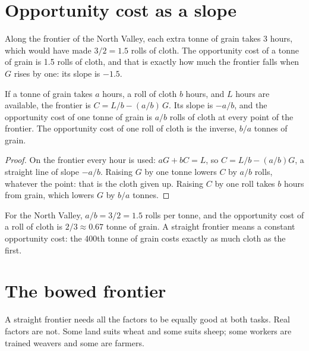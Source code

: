 \section{Opportunity cost as a slope}\label{sec:g10:production-possibility-frontier:slope}

Along the frontier of the North Valley, each extra tonne of grain takes 3 hours, which would have made
$3/2 = 1.5$ rolls of cloth. The opportunity cost of a tonne of grain is 1.5 rolls of cloth, and that is
exactly how much the frontier falls when $G$ rises by one: its slope is $-1.5$.

\begin{proposition}\label{prop:g10:production-possibility-frontier:slope}
If a tonne of grain takes $a$ hours, a roll of cloth $b$ hours, and $L$ hours are available, the
frontier is $C = L/b - (a/b)\,G$. Its slope is $-a/b$, and the opportunity cost of one tonne of grain is
$a/b$ rolls of cloth at every point of the frontier. The opportunity cost of one roll of cloth is the
inverse, $b/a$ tonnes of grain.
\end{proposition}
\begin{proof}
On the frontier every hour is used: $aG + bC = L$, so $C = L/b - (a/b)G$, a straight line of slope
$-a/b$. Raising $G$ by one tonne lowers $C$ by $a/b$ rolls, whatever the point: that is the cloth given
up. Raising $C$ by one roll takes $b$ hours from grain, which lowers $G$ by $b/a$ tonnes.
\end{proof}

For the North Valley, $a/b = 3/2 = 1.5$ rolls per tonne, and the opportunity cost of a roll of cloth is
$2/3 \approx 0.67$ tonne of grain. A straight frontier means a constant opportunity cost: the 400th
tonne of grain costs exactly as much cloth as the first.

\section{The bowed frontier}\label{sec:g10:production-possibility-frontier:bowed}

A straight frontier needs all the factors to be equally good at both tasks. Real factors are not.
Some land suits wheat and some suits sheep; some workers are trained weavers and some are farmers.

